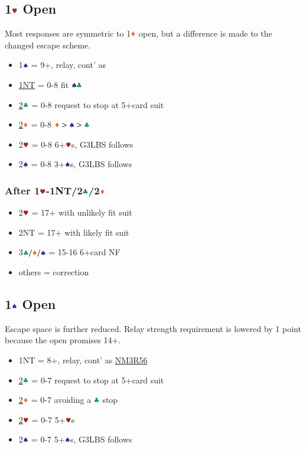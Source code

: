 \documentclass{article}
\begin{document}
\begin{multicols}{2}
\subsection{1$\hhh$ Open}\label{sec:1h}
Most responses are symmetric to 1$\ddd$ open, but a difference is made to the changed escape scheme.
\begin{itemize}
    \item 1$\sss$ = 9+, relay, cont' as 
    \item \hyperref[sec:1h-escape]{1NT} = 0-8 fit $\sss\ccc$
    \item \hyperref[sec:1h-escape]{2$\ccc$} = 0-8 request to stop at 5+card suit
    \item \hyperref[sec:1h-escape]{2$\ddd$} = 0-8 $\ddd>\sss>\ccc$
    \item 2$\hhh$ = 0-8 6+$\hhh$s, G3LBS follows
    \item 2$\sss$ = 0-8 3+$\sss$s, G3LBS follows
\end{itemize}

\subsubsection{After 1$\hhh$-1NT/2$\ccc$/2$\ddd$}\label{sec:1h-escape}
\begin{itemize}
    \item 2$\hhh$ = 17+ with unlikely fit suit
    \item 2NT = 17+ with likely fit suit
    \item 3$\ccc/\ddd/\sss$ = 15-16 6+card NF
    \item others = correction
\end{itemize}

\subsection{1$\sss$ Open}\label{sec:1s}
Escape space is further reduced. Relay strength requirement is lowered by 1 point because the open promises 14+.
\begin{itemize}
    \item 1NT = 8+, relay, cont' as \hyperref[sec:nlm3r56]{NM3R56}
    \item \hyperref[sec:1s-escape]{2$\ccc$} = 0-7 request to stop at 5+card suit
    \item \hyperref[sec:1s-escape]{2$\ddd$} = 0-7 avoiding a $\ccc$ stop
    \item \hyperref[sec:1s-escape]{2$\hhh$} = 0-7 5+$\hhh$s
    \item 2$\sss$ = 0-7 5+$\sss$s, G3LBS follows
\end{itemize}


\end{multicols}
\end{document}
